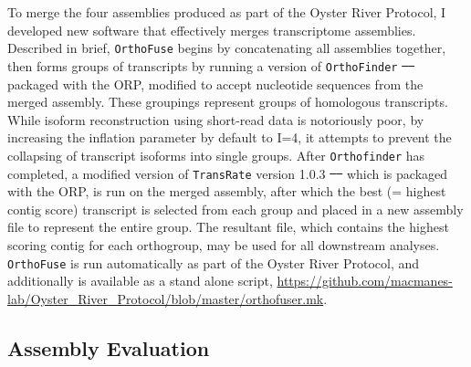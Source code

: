 \documentclass[10pt,letterpaper]{article}
\providecommand{\DIFaddtex}[1]{{\protect\color{blue}\uwave{#1}}} %
\providecommand{\DIFdeltex}[1]{{\protect\color{red}\sout{#1}}}                      %
\providecommand{\DIFaddbegin}{} %
\providecommand{\DIFaddend}{} %
\providecommand{\DIFdelbegin}{} %
\providecommand{\DIFdelend}{} %
\providecommand{\DIFadd}[1]{\texorpdfstring{\DIFaddtex{#1}}{#1}} %
\providecommand{\DIFdel}[1]{\texorpdfstring{\DIFdeltex{#1}}{}} %
\newcommand{\DIFscaledelfig}{0.5}
\newlength{\DIFdelgraphicswidth} %
\newlength{\DIFdelgraphicsheight} %
\newcommand{\DIFaddincludegraphics}[2][]{{\color{blue}\fbox{\DIFOincludegraphics[#1]{#2}}}} %
\newcommand{\DIFdelincludegraphics}[2][]{%
\sbox{\DIFdelgraphicsbox}{\DIFOincludegraphics[#1]{#2}}%
\settoboxwidth{\DIFdelgraphicswidth}{\DIFdelgraphicsbox} %
\settoboxtotalheight{\DIFdelgraphicsheight}{\DIFdelgraphicsbox} %
\scalebox{\DIFscaledelfig}{%
\parbox[b]{\DIFdelgraphicswidth}{\usebox{\DIFdelgraphicsbox}\\[-\baselineskip] \rule{\DIFdelgraphicswidth}{0em}}\llap{\resizebox{\DIFdelgraphicswidth}{\DIFdelgraphicsheight}{%
\setlength{\unitlength}{\DIFdelgraphicswidth}%
\begin{picture}(1,1)%
\thicklines\linethickness{2pt} %
{\color[rgb]{1,0,0}\put(0,0){\framebox(1,1){}}}%
{\color[rgb]{1,0,0}\put(0,0){\line( 1,1){1}}}%
{\color[rgb]{1,0,0}\put(0,1){\line(1,-1){1}}}%
\end{picture}%
}\hspace*{3pt}}} %
} %
\DeclareRobustCommand{\DIFaddbegin}{\DIFOaddbegin \let\includegraphics\DIFaddincludegraphics} %
\DeclareRobustCommand{\DIFaddend}{\DIFOaddend \let\includegraphics\DIFOincludegraphics} %
\DeclareRobustCommand{\DIFdelbegin}{\DIFOdelbegin \let\includegraphics\DIFdelincludegraphics} %
\DeclareRobustCommand{\DIFdelend}{\DIFOaddend \let\includegraphics\DIFOincludegraphics} %
\begin{document}
To merge the four assemblies produced as part of the Oyster River Protocol, I developed new software that effectively merges transcriptome assemblies. Described in brief, \texttt{OrthoFuse} begins by concatenating all assemblies together, then forms groups of transcripts by running a version of \texttt{OrthoFinder} \DIFdelbegin \DIFdel{\mbox{%
\cite{Emms:2015iga} }%
}\DIFdelend \DIFaddbegin \DIFadd{\mbox{%
\citep{Emms:2015iga} }%
}\DIFaddend packaged with the ORP, modified to accept nucleotide sequences from the merged assembly. These groupings represent groups of homologous transcripts. While isoform reconstruction using short-read data is notoriously poor, by increasing the inflation parameter by default to I=4, it attempts to prevent the collapsing of transcript isoforms into single groups. After \texttt{Orthofinder} has completed, a modified version of \texttt{TransRate} version 1.0.3 \DIFdelbegin \DIFdel{\mbox{%
\cite{SmithUnna:2016go} }%
}\DIFdelend \DIFaddbegin \DIFadd{\mbox{%
\citep{SmithUnna:2016go} }%
}\DIFaddend which is packaged with the ORP, is run on the merged assembly, after which the best (= highest contig score) transcript is selected from each group and placed in a new assembly file to represent the entire group. The resultant file, which contains the highest scoring contig for each orthogroup, may be used for all downstream analyses. \texttt{OrthoFuse} is run automatically as part of the Oyster River Protocol, and additionally is available as a stand alone script, \url{https://github.com/macmanes-lab/Oyster_River_Protocol/blob/master/orthofuser.mk}. 

\subsection{Assembly Evaluation}
\end{document}
